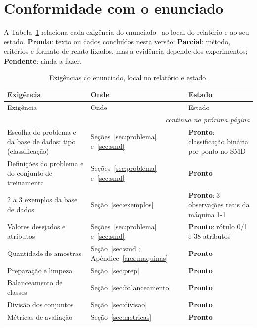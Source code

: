 \section{Conformidade com o enunciado}\label{apx:checklist}

\newcommand{\stpronto}{\textcolor{green!45!black}{\textbf{Pronto}}}
\newcommand{\stparcial}{\textcolor{orange!80!black}{\textbf{Parcial}}}
\newcommand{\stpendente}{\textcolor{red!70!black}{\textbf{Pendente}}}

A Tabela~\ref{tab:checklist} relaciona cada exigência do enunciado~\cite{enunciado} ao local do relatório e ao seu
estado. \stpronto: texto ou dados concluídos nesta versão; \stparcial: método, critérios e formato de relato
fixados, mas a evidência depende dos experimentos; \stpendente: ainda a fazer.

{\small
\begin{longtable}{@{}p{5.4cm}p{3.7cm}p{5.4cm}@{}}
\caption{Exigências do enunciado, local no relatório e estado.}\label{tab:checklist}\\
\toprule
Exigência & Onde & Estado\\
\midrule
\endfirsthead
\toprule
Exigência & Onde & Estado\\
\midrule
\endhead
\midrule
\multicolumn{3}{r}{\emph{continua na próxima página}}\\
\endfoot
\bottomrule
\endlastfoot
Escolha do problema e da base de dados; tipo (classificação) &
Seções~\ref{sec:problema} e~\ref{sec:smd} &
\stpronto: classificação binária por ponto no SMD\\[3pt]
Definições do problema e do conjunto de treinamento &
Seções~\ref{sec:problema} e~\ref{sec:smd} &
\stpronto\\[3pt]
2 a 3 exemplos da base de dados &
Seção~\ref{sec:exemplos} &
\stpronto: 3 observações reais da máquina 1-1\\[3pt]
Valores desejados e atributos &
Seções~\ref{sec:problema} e~\ref{sec:smd} &
\stpronto: rótulo 0/1 e 38 atributos\\[3pt]
Quantidade de amostras &
Seção~\ref{sec:smd}; Apêndice~\ref{apx:maquinas} &
\stpronto\\[3pt]
Preparação e limpeza &
Seção~\ref{sec:prep} &
\stpronto\\[3pt]
Balanceamento de classes &
Seção~\ref{sec:balanceamento} &
\stpronto\\[3pt]
Divisão dos conjuntos &
Seção~\ref{sec:divisao} &
\stpronto\\[3pt]
Métricas de avaliação &
Seção~\ref{sec:metricas} &
\stpronto\\[3pt]

\end{longtable}}
